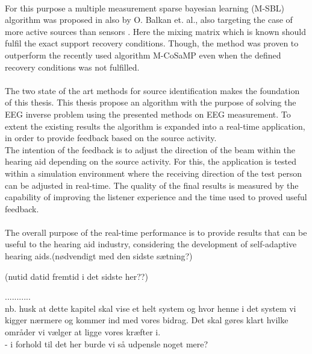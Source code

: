 \\
For this purpose a multiple measurement sparse bayesian learning (M-SBL) algorithm was proposed in \cite{Balkan2014} also by O. Balkan et. al., also targeting the case of more active sources than sensors \cite{Balkan2014}. Here the mixing matrix which is known should fulfil the exact support recovery conditions. Though, the method was proven to outperform the recently used algorithm M-CoSaMP even when the defined recovery conditions was not fulfilled.  
\\   
\\
The two state of the art methods for source identification makes the foundation of this thesis. This thesis propose an algorithm with the purpose of solving the EEG inverse problem using the presented methods on EEG measurement. To extent the existing results the algorithm is expanded into a real-time application, in order to provide feedback based on the source activity.\\
The intention of the feedback is to adjust the direction of the beam within the hearing aid depending on the source activity.      
For this, the application is tested within a simulation environment where the receiving direction of the test person can be adjusted in real-time. 
The quality of the final results is measured by the capability of improving the listener experience and the time used to proved useful feedback. \\
\\
The overall purpose of the real-time performance is to provide results that can be useful to the hearing aid industry, considering the development of self-adaptive hearing aids.(nødvendigt med den sidste sætning?) 


(nutid datid fremtid i det sidste her??)

...........\\
nb. husk at dette kapitel skal vise et helt system og hvor henne i det system vi kigger nærmere og kommer ind med vores bidrag. Det skal gøres klart hvilke områder vi vælger at ligge vores kræfter i.  \\
- i forhold til det her burde vi så udpensle noget mere? 





 
